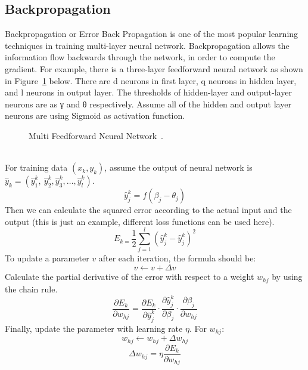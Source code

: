 \documentclass[]{UCD_CS_FYP_Report}
\begin{document}
\subsection{Backpropagation}
Backpropagation or Error Back Propagation is one of the most popular learning techniques in training multi-layer neural network. Backpropagation allows the information flow backwards through the network, in order to compute the gradient. For example, there is a three-layer feedforward neural network as shown in Figure~\ref{fig:Multi_Feedforward_Neural_Network} below. There are d neurons in first layer, q neurons in hidden layer, and l neurons in output layer. The thresholds of hidden-layer and output-layer neurons are as γ and θ respectively. Assume all of the hidden and output layer neurons are using Sigmoid as activation function.
\begin{figure}[h]
\centering
\fboxsep 2mm
\caption{\label{fig:Multi_Feedforward_Neural_Network} Multi Feedforward Neural Network~\cite{Zhou:2016}.}
\end{figure}
\\For training data $(x_k,y_k)$, assume the output of neural network is
${\hat{y}}_k=({\hat{y}}_1^k{,\ \hat{y}}_2^k,{\hat{y}}_3^k,…,{\hat{y}}_l^k)$.
\begin{equation}
{\hat{y}}_j^k=f({\beta{}}_j-{\theta{}}_j)
\end{equation}
Then we can calculate the squared error according to the actual input and the output (this is just an example, different loss functions can be used here).
\begin{equation}
E_{k=}\frac{1}{2}\sum_{j=1}^l{({\hat{y}}_j^k-{\hat{y}}_j^k)}^2
\end{equation}
To update a parameter $v$ after each iteration, the formula should be:
\begin{equation}
v\leftarrow{}v+\Delta{}v
\end{equation}
Calculate the partial derivative of the error with respect to a weight $w_{hj}$ by using the chain rule.
\begin{equation}
\frac{\partial{}E_k}{\partial{}w_{hj}}=\frac{\partial{}E_k}{\partial{}{\hat{y}}_j^k}\cdot{}\frac{\partial{}{\hat{y}}_j^k}{\partial{}{\beta{}}_j}\cdot{}\frac{\partial{}{\beta{}}_j}{\partial{}w_{hj}}
\end{equation}
Finally, update the parameter with learning rate $\eta{}$. For $w_{hj}$:
\begin{equation}
w_{hj}\leftarrow{}w_{hj}+\Delta{}w_{hj}
\end{equation}
\begin{equation}
\Delta{}w_{hj}=\eta{}\frac{\partial{}E_k}{\partial{}w_{hj}}
\end{equation}
\end{document}
